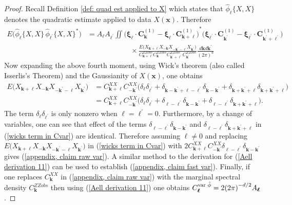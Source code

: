 \documentclass[10pt,noinfoline]{imsart}
\newcommand{\bs}{\boldsymbol}
\begin{document}
\begin{proof}
    Recall Definition \ref{def: quad est applied to X} which states that $\hat\phi_{\bs \ell}\{X,\!X\}$ denotes the quadratic estimate applied to data $X(\bs x)$. Therefore 
    \begin{align}
        E\big(\hat\phi_{\bs \ell}\{X,\!X\} \, \hat\phi_{\bs \ell^\prime}\{X,\!X\}^*\big)
        & = A_{\bs \ell}A_{\bs \ell^\prime}
        \iint
        {\Big(\bs\xi_{\bs \ell} \!\cdot\!\bs C^{{(1)}}_{\bs k} - \bs\xi_{\bs \ell} \!\cdot\!\bs C^{{(1)}}_{\bs k+\bs \ell}\Big)}^{\! *}
        {\Big(\bs\xi_{\bs \ell^\prime} \!\cdot\!\bs C^{{(1)}}_{\bs k^\prime} - \bs\xi_{\bs \ell^\prime} \!\cdot\!\bs C^{{(1)}}_{\bs k^\prime+\bs \ell^\prime}\Big)}^{}\nonumber\\
        &\qquad\qquad\qquad
        \times
        \frac{E\bigl(X_{\bs k+\bs \ell}X_{-\bs k}X_{-\bs k^\prime-\bs\ell}X_{\bs k^\prime}\bigr)}{C^{ZZobs}_{\bs k+\bs \ell}C^{ZZobs}_{\bs k}C^{ZZobs}_{\bs k^\prime+\bs \ell^\prime}C^{ZZobs}_{\bs k^\prime}}
        \frac{d\bs kd\bs k^\prime}{{(2\pi)}^{d}}\label{wicks term in Cvar}
    \end{align}
    Now expanding the above fourth moment, using Wick's theorem (also called Isserlis's Theorem) \cite{wick1950evaluation, isserlis1916certain} and the Gaussianity of $X(\bs x)$, one obtains
    \begin{align*}
        E\bigl(X_{\bs k+\bs \ell}X_{-\bs k}X_{-\bs k^\prime-\bs\ell}X_{\bs k^\prime}\bigr)
        &=C^{X\!X}_{\bs k+\bs \ell}C^{X\!X}_{-\bs k^\prime}\bigl( \delta_{\bs\ell}\delta_{\bs\ell^\prime} +  \delta_{\bs k-\bs k^\prime + \bs \ell-\bs\ell^\prime}\delta_{\bs k-\bs k^\prime} +  \delta_{\bs k + \bs k^\prime +\bs\ell}\delta_{\bs k + \bs k^\prime +\bs\ell}   \bigr) \\
        &=C^{X\!X}_{\bs k+\bs\ell}C^{X\!X}_{-\bs k^\prime}\bigl( \delta_{\bs\ell}\delta_{\bs\ell^\prime} +  \delta_{ 
        \bs\ell-\bs\ell^\prime}\delta_{\bs k-\bs k^\prime} +  \delta_{\bs\ell-\bs\ell^\prime}\delta_{\bs k+\bs k^\prime +\bs\ell}   \bigr).
    \end{align*}
    The term $\delta_{\bs\ell}\delta_{\bs\ell^\prime}$ is only nonzero  when $\bs\ell=\bs\ell^\prime=0$. Furthermore, by a change of variables, one can see that effect of the terms $\delta_{ \bs\ell-\bs\ell^\prime}\delta_{\bs k-\bs k^\prime}$ and $ \delta_{\bs\ell-\bs\ell^\prime}\delta_{\bs k+\bs k^\prime +\bs \ell}$ in (\ref{wicks term in Cvar}) are identical. Therefore assuming $\bs \ell \neq 0$ and replacing  $E\bigl(X_{\bs k+\bs \ell}X_{-\bs k}X_{-\bs k^\prime-\bs\ell}X_{\bs k^\prime}\bigr)$ in (\ref{wicks term in Cvar}) with $2C^{X\!X}_{\bs k+\bs\ell}C^{X\!X}_{-\bs k^\prime}\delta_{ \bs\ell-\bs\ell^\prime}\delta_{\bs k-\bs k^\prime}$ gives (\ref{appendix, claim raw var}). A similar method to the derivation for (\ref{Aell derivation 11}) can be used to establish (\ref{appendix, claim fast var}). Finally, if one replaces $C^{X\!X}_{\bs k}$ in (\ref{appendix, claim raw var}) with the marginal spectral density $C^{ZZobs}_{\bs k}$ then using (\ref{Aell derivation 11}) one obtains $C_{\bs\ell}^{\text{\rm var }\hat{\phi}} =  2{(2\pi)}^{-d/2} A_{\bs\ell}$.

\end{proof}
\end{document}
